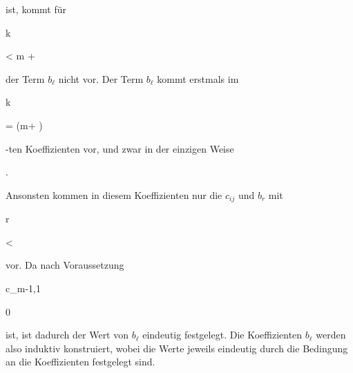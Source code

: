 {{{  }{
}

{    }{
}

{   }{
}

}
{}{}{}
ist, kommt für


\mavergleichskette

{\vergleichskette

{k
}

{ < }{ m + 
}

{  }{
}

{    }{
}

{   }{
}

}
{}{}{}
der Term $b_\ell$ nicht vor. Der Term $b_\ell$ kommt erstmals im


\mavergleichskette

{\vergleichskette

{ k
}

{ = }{ (m+ )
}

{  }{
}

{    }{
}

{   }{
}

}
{}{}{-}ten Koeffizienten vor, und zwar in der einzigen Weise


 { . }


Ansonsten kommen in diesem Koeffizienten nur die $c_{ij}$ und $b_r$ mit


\mavergleichskette

{\vergleichskette

{r
}

{ < }{ \ell
}

{  }{
}

{    }{
}

{   }{
}

}
{}{}{}
vor. Da nach Voraussetzung


\mavergleichskette

{\vergleichskette

{ c_{m-1,1}
}

{ \neq }{ 0
}

{  }{
}

{    }{
}

{   }{
}

}
{}{}{}
ist, ist dadurch der Wert von $b_\ell$ eindeutig festgelegt. Die Koeffizienten $b_\ell$ werden also induktiv konstruiert, wobei die Werte jeweils eindeutig durch die Bedingung an die Koeffizienten festgelegt sind.


}



